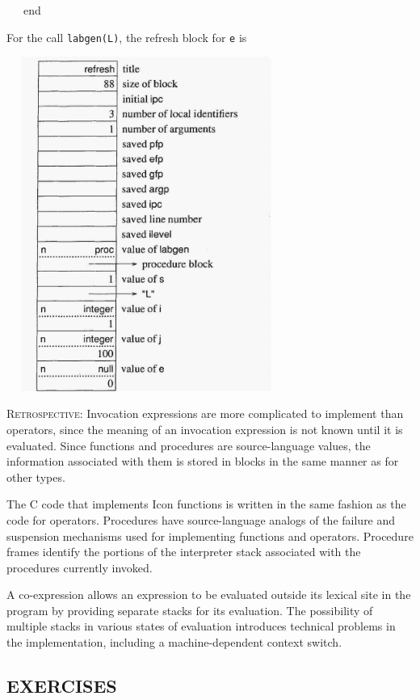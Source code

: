 {\ttfamily\mdseries
\ \ \ end}


For the call \texttt{labgen({\textquotedbl}L{\textquotedbl})}, the refresh block for \texttt{e} is


\ \  \includegraphics[width=3.3134in,height=4.3075in]{ib-img/ib-img088.jpg} 


\textsc{Retrospective}: Invocation expressions are more complicated to
implement than operators, since the meaning of an invocation
expression is not known until it is evaluated. Since functions and
procedures are source-language values, the information associated with
them is stored in blocks in the same manner as for other types.

The C code that implements Icon functions is written in the same
fashion as the code for operators. Procedures have source-language
analogs of the failure and suspension mechanisms used for implementing
functions and operators.  Procedure frames identify the portions of
the interpreter stack associated with the procedures currently
invoked.

A co-expression allows an expression to be evaluated outside its
lexical site in the program by providing separate stacks for its
evaluation. The possibility of multiple stacks in various states of
evaluation introduces technical problems in the implementation,
including a machine-dependent context switch.

\subsection{EXERCISES}


